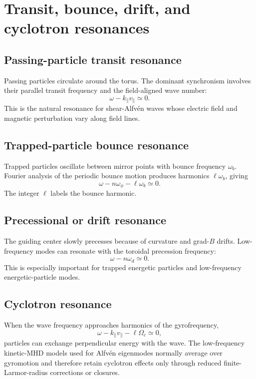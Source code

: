 \documentclass[11pt]{article}
\begin{document}
\section{Transit, bounce, drift, and cyclotron resonances}
\subsection{Passing-particle transit resonance}
Passing particles circulate around the torus. The dominant synchronism involves their parallel transit frequency and the field-aligned wave number:
\begin{equation}
\omega-k_\parallel v_\parallel\simeq0.
\end{equation}
This is the natural resonance for shear-Alfv\'en waves whose electric field and magnetic perturbation vary along field lines.

\subsection{Trapped-particle bounce resonance}
Trapped particles oscillate between mirror points with bounce frequency $\omega_b$. Fourier analysis of the periodic bounce motion produces harmonics $\ell\omega_b$, giving
\begin{equation}
\omega-n\omega_\phi-\ell\omega_b\simeq0.
\end{equation}
The integer $\ell$ labels the bounce harmonic.

\subsection{Precessional or drift resonance}
The guiding center slowly precesses because of curvature and grad-$B$ drifts. Low-frequency modes can resonate with the toroidal precession frequency:
\begin{equation}
\omega-n\omega_d\simeq0.
\end{equation}
This is especially important for trapped energetic particles and low-frequency energetic-particle modes.

\subsection{Cyclotron resonance}
When the wave frequency approaches harmonics of the gyrofrequency,
\begin{equation}
\omega-k_\parallel v_\parallel-\ell\Omega_c\simeq0,
\end{equation}
particles can exchange perpendicular energy with the wave. The low-frequency kinetic-MHD models used for Alfv\'en eigenmodes normally average over gyromotion and therefore retain cyclotron effects only through reduced finite-Larmor-radius corrections or closures.
\end{document}
